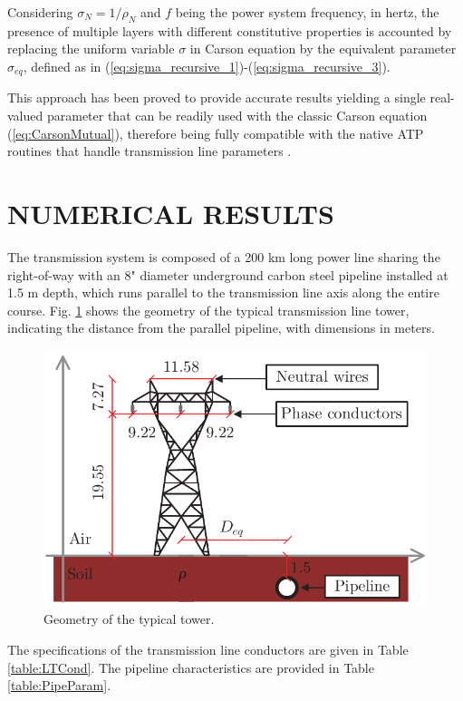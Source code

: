 \documentclass[conference]{IEEEtran}
\begin{document}
	
	Considering $\sigma_{N} = 1/\rho_{N}$  and $f$ being the power system frequency, in hertz, the presence of multiple layers with different constitutive properties is accounted by replacing the uniform variable $\sigma$ in Carson equation by the equivalent parameter $\sigma_{eq}$, defined as in (\ref{eq:sigma_recursive_1})-(\ref{eq:sigma_recursive_3}).
	
	This approach has been proved to provide accurate results yielding a single real-valued parameter that can be readily used with the classic Carson equation (\ref{eq:CarsonMutual}), therefore being fully compatible with the native ATP routines that handle transmission line parameters \cite{Martins-Britto2019}.
	
	
	\section{NUMERICAL RESULTS}
	
	The transmission system is composed of a 200 km long power line sharing the right-of-way with an 8" diameter underground carbon steel pipeline installed at 1.5 m depth, which runs parallel to the transmission line axis along the entire course. Fig.  \ref{fig:SistTesteCorte} shows the geometry of the typical transmission line tower, indicating the distance from the parallel pipeline, with dimensions in meters.
	
	\begin{figure}[hbt]
		\begin{center}
			\includegraphics[width=.8\columnwidth]{fig/SistTesteCorte2.pdf}
			\caption{Geometry of the typical tower.}
			\label{fig:SistTesteCorte}
		\end{center}
	\end{figure}
	
	The specifications of the transmission line conductors  are given in Table \ref{table:LTCond}. The pipeline characteristics are provided in Table \ref{table:PipeParam}.
	
\end{document}
